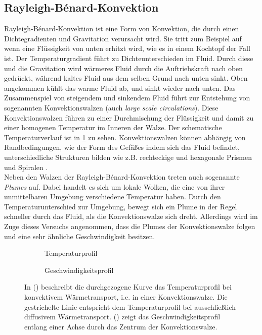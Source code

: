 \subsection{Rayleigh-B\'enard-Konvektion}
Rayleigh-B\'enard-Konvektion ist eine Form von Konvektion, die durch einen Dichtegradienten und Gravitation verursacht wird. 
Sie tritt zum Beispiel auf wenn eine Flüssigkeit von unten erhitzt wird, wie es in einem Kochtopf der Fall ist. 
Der Temperaturgradient führt zu Dichteunterschieden im Fluid. Durch diese und die Gravitation wird wärmeres Fluid durch die Auftriebskraft nach oben gedrückt, während kaltes Fluid aus dem selben Grund nach unten sinkt.
Oben angekommen kühlt das warme Fluid ab, und sinkt wieder nach unten. 
Das Zusammenspiel von steigendem und sinkendem Fluid führt zur Entstehung von sogenannten Konvektionswalzen (auch \emph{large scale circulations}). 
Diese Konvektionswalzen führen zu einer Durchmischung der Flüssigkeit und damit zu einer homogenen Temperatur im Inneren der Walze. Der schematische Temperaturverlauf ist in \cref{fig:scheme_t} zu sehen.
Konvektionswalzen können abhängig von Randbedingungen, wie der Form des Gefäßes indem sich das Fluid befindet, unterschiedliche Strukturen bilden wie z.B. rechteckige und hexagonale Prismen und Spiralen \cite{Structures}.
\\
Neben den Walzen der Rayleigh-B\'enard-Konvektion treten auch sogenannte \mbox{\emph{Plumes}} auf. Dabei handelt es sich um lokale Wolken, die eine von ihrer unmittelbaren Umgebung verschiedene Temperatur haben. Durch den Temperaturunterschied zur Umgebung, bewegt sich ein Plume in der Regel schneller durch das Fluid, als die Konvektionswalze sich dreht. Allerdings wird im Zuge dieses Versuchs angenommen, dass die Plumes der Konvektionswalze folgen und eine sehr ähnliche Geschwindigkeit besitzen. 

\begin{figure}
\begin{subfigure}{0.45\textwidth}
	\caption{Temperaturprofil}\label{fig:scheme_t}
\end{subfigure}
\hspace{1cm}
\begin{subfigure}{0.45\textwidth}
	\caption{Geschwindigkeitsprofil}\label{fig:scheme_v}
\end{subfigure}
\caption{ In () beschreibt die durchgezogene Kurve das Temperaturprofil bei konvektivem Wärmetransport, i.e. in einer Konvektionswalze. Die gestrichelte Linie entspricht dem Temperaturprofil bei ausschließlich diffusivem Wärmetransport. () zeigt das Geschwindigkeitsprofil entlang einer Achse durch das Zentrum der Konvektionswalze.}
\end{figure}

